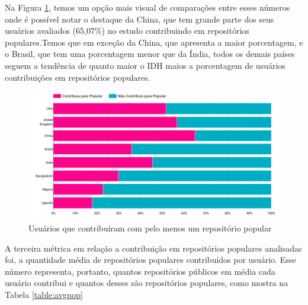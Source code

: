 \documentclass[12pt]{article}
\begin{document}
Na Figura \ref{fig:atleatone}, temos um opção mais visual de comparações entre esses números onde é possível notar o destaque da China, que tem grande parte dos seus usuários avaliados (65,07\%) no estudo contribuindo em repositórios populares.Temos que em exceção da China, que apresenta a maior porcentagem, e o Brasil, que tem uma porcentagem menor que da Índia, todos os demais países seguem a tendência de quanto maior o IDH maios a porcentagem de usuários contribuições em repositórios populares.

\begin{figure}[H]
\centering
\includegraphics[width=1\textwidth]{img/rq2/atleatone.png}
\caption{Usuários que contribuíram com pelo menos um repositório popular}
\label{fig:atleatone}
\end{figure}

A terceira métrica em relação a contribuição em repositórios populares analisadas foi, a quantidade média de repositórios populares contribuídos por usuário. Esse número representa, portanto, quantos repositórios públicos em média cada usuário contribui e quantos desses são repositórios populares, como mostra na Tabela \ref{table:avgpop}
\end{document}
